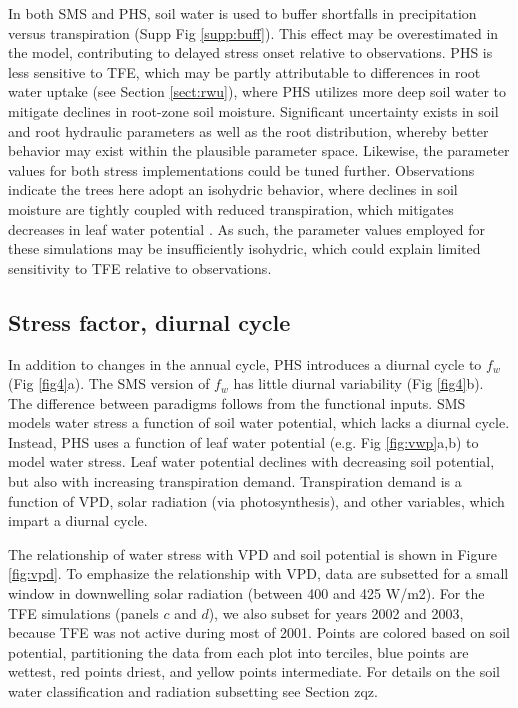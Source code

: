 \documentclass[draft,linenumbers]{agujournal}
\begin{document}
In both SMS and PHS, soil water is used to buffer shortfalls in precipitation versus transpiration (Supp Fig \ref{supp:buff}).
This effect may be overestimated in the model, contributing to delayed stress onset relative to observations.
PHS is less sensitive to TFE, which may be partly attributable to differences in root water uptake (see Section \ref{sect:rwu}), 
where PHS utilizes more deep soil water to mitigate declines in root-zone soil moisture.
Significant uncertainty exists in soil and root hydraulic parameters as well as the root distribution, whereby better behavior may exist within the plausible parameter space.
Likewise, the parameter values for both stress implementations could be tuned further.
Observations indicate the trees here adopt an isohydric behavior, where declines in soil moisture 
are tightly coupled with reduced transpiration, which mitigates decreases in leaf water potential \citep{fisher2006}.
As such, the parameter values employed for these simulations may be insufficiently isohydric, which could explain limited sensitivity to TFE relative to observations.

\subsection{Stress factor, diurnal cycle}

In addition to changes in the annual cycle, PHS introduces a diurnal cycle to $f_w$ (Fig \ref{fig4}a). 
The SMS version of $f_w$ has little diurnal variability (Fig \ref{fig4}b).
The difference between paradigms follows from the functional inputs.
SMS models water stress a function of soil water potential, which lacks a diurnal cycle.
Instead, PHS uses a function of leaf water potential (e.g. Fig \ref{fig:vwp}a,b) to model water stress.
Leaf water potential declines with decreasing soil potential, but also with increasing transpiration demand.
Transpiration demand is a function of VPD, solar radiation (via photosynthesis), and other variables, which impart a diurnal cycle.

The relationship of water stress with VPD and soil potential is shown in Figure \ref{fig:vpd}. 
To emphasize the relationship with VPD, data are subsetted for a small window in downwelling solar radiation (between 400 and 425 W/m2).
For the TFE simulations (panels $c$ and $d$), we also subset for years 2002 and 2003, because TFE was not active during most of 2001.
Points are colored based on soil potential, partitioning the data from each plot into terciles, blue points are wettest, red points driest, and yellow points intermediate.
For details on the soil water classification and radiation subsetting see Section zqz.
\end{document}
